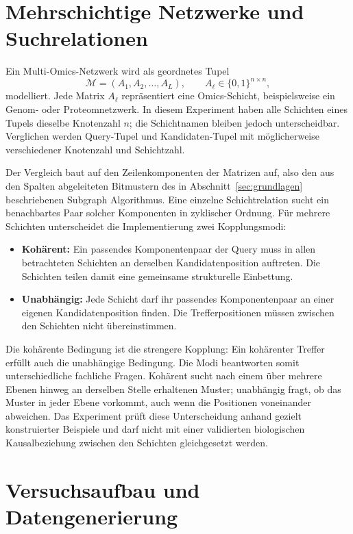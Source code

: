 \documentclass[a4paper,12pt, twoside]{report}
\theoremstyle{definition}
\begin{document}
\section{Mehrschichtige Netzwerke und Suchrelationen}
\label{sec:multiomics_relation}

Ein Multi-Omics-Netzwerk wird als geordnetes Tupel
\[
\mathcal{M}=(A_1,A_2,\ldots,A_L), \qquad A_\ell\in\{0,1\}^{n\times n},
\]
modelliert. Jede Matrix $A_\ell$ repräsentiert eine Omics-Schicht, beispielsweise ein Genom- oder Proteomnetzwerk. In diesem Experiment haben alle Schichten eines Tupels dieselbe Knotenzahl $n$; die Schichtnamen bleiben jedoch unterscheidbar. Verglichen werden Query-Tupel und Kandidaten-Tupel mit möglicherweise verschiedener Knotenzahl und Schichtzahl.

Der Vergleich baut auf den Zeilenkomponenten der Matrizen auf, also den aus den Spalten abgeleiteten Bitmustern des in Abschnitt~\ref{sec:grundlagen} beschriebenen Subgraph Algorithmus. Eine einzelne Schichtrelation sucht ein benachbartes Paar solcher Komponenten in zyklischer Ordnung. Für mehrere Schichten unterscheidet die Implementierung zwei Kopplungsmodi:

\begin{itemize}
\item \textbf{Kohärent:} Ein passendes Komponentenpaar der Query muss in allen betrachteten Schichten an derselben Kandidatenposition auftreten. Die Schichten teilen damit eine gemeinsame strukturelle Einbettung.
\item \textbf{Unabhängig:} Jede Schicht darf ihr passendes Komponentenpaar an einer eigenen Kandidatenposition finden. Die Trefferpositionen müssen zwischen den Schichten nicht übereinstimmen.
\end{itemize}

Die kohärente Bedingung ist die strengere Kopplung: Ein kohärenter Treffer erfüllt auch die unabhängige Bedingung. Die Modi beantworten somit unterschiedliche fachliche Fragen. Kohärent sucht nach einem über mehrere Ebenen hinweg an derselben Stelle erhaltenen Muster; unabhängig fragt, ob das Muster in jeder Ebene vorkommt, auch wenn die Positionen voneinander abweichen. Das Experiment prüft diese Unterscheidung anhand gezielt konstruierter Beispiele und darf nicht mit einer validierten biologischen Kausalbeziehung zwischen den Schichten gleichgesetzt werden.

\section{Versuchsaufbau und Datengenerierung}
\label{sec:multiomics_setup}
\end{document}
